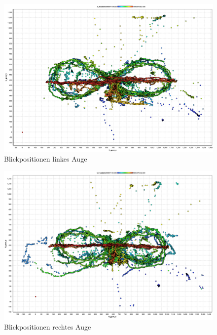 \begin{figure}[H]
	\noindent \begin{centering}
		\includegraphics[width=15cm]{pics/BlickeLinkesAuge.png}
		\par\end{centering}
	\caption{\label{fig:BlickeLinkesAuge}Blickpositionen linkes Auge}
\end{figure}

\begin{figure}[H]
	\noindent \begin{centering}
		\includegraphics[width=15cm]{pics/BlickeRechtesAuge.png}
		\par\end{centering}
	\caption{\label{fig:BlickeRechtesAuge}Blickpositionen rechtes Auge}
\end{figure}

